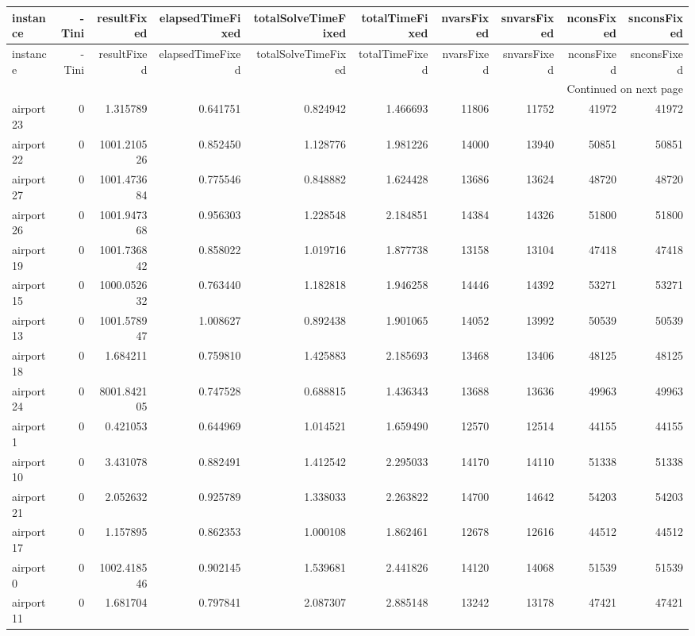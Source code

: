 \begin{longtable}{|l|r|r|r|r|r|r|r|r|r|}
\toprule
instance & -Tini & resultFixed & elapsedTimeFixed & totalSolveTimeFixed & totalTimeFixed & nvarsFixed & snvarsFixed & nconsFixed & snconsFixed \\
\midrule
\endfirsthead
\toprule
instance & -Tini & resultFixed & elapsedTimeFixed & totalSolveTimeFixed & totalTimeFixed & nvarsFixed & snvarsFixed & nconsFixed & snconsFixed \\
\midrule
\endhead
\midrule
\multicolumn{10}{r}{Continued on next page} \\
\midrule
\endfoot
\bottomrule
\endlastfoot
airport23 & 0 & 1.315789 & 0.641751 & 0.824942 & 1.466693 & 11806 & 11752 & 41972 & 41972 \\
airport22 & 0 & 1001.210526 & 0.852450 & 1.128776 & 1.981226 & 14000 & 13940 & 50851 & 50851 \\
airport27 & 0 & 1001.473684 & 0.775546 & 0.848882 & 1.624428 & 13686 & 13624 & 48720 & 48720 \\
airport26 & 0 & 1001.947368 & 0.956303 & 1.228548 & 2.184851 & 14384 & 14326 & 51800 & 51800 \\
airport19 & 0 & 1001.736842 & 0.858022 & 1.019716 & 1.877738 & 13158 & 13104 & 47418 & 47418 \\
airport15 & 0 & 1000.052632 & 0.763440 & 1.182818 & 1.946258 & 14446 & 14392 & 53271 & 53271 \\
airport13 & 0 & 1001.578947 & 1.008627 & 0.892438 & 1.901065 & 14052 & 13992 & 50539 & 50539 \\
airport18 & 0 & 1.684211 & 0.759810 & 1.425883 & 2.185693 & 13468 & 13406 & 48125 & 48125 \\
airport24 & 0 & 8001.842105 & 0.747528 & 0.688815 & 1.436343 & 13688 & 13636 & 49963 & 49963 \\
airport1 & 0 & 0.421053 & 0.644969 & 1.014521 & 1.659490 & 12570 & 12514 & 44155 & 44155 \\
airport10 & 0 & 3.431078 & 0.882491 & 1.412542 & 2.295033 & 14170 & 14110 & 51338 & 51338 \\
airport21 & 0 & 2.052632 & 0.925789 & 1.338033 & 2.263822 & 14700 & 14642 & 54203 & 54203 \\
airport17 & 0 & 1.157895 & 0.862353 & 1.000108 & 1.862461 & 12678 & 12616 & 44512 & 44512 \\
airport0 & 0 & 1002.418546 & 0.902145 & 1.539681 & 2.441826 & 14120 & 14068 & 51539 & 51539 \\
airport11 & 0 & 1.681704 & 0.797841 & 2.087307 & 2.885148 & 13242 & 13178 & 47421 & 47421 \\

\end{longtable}
